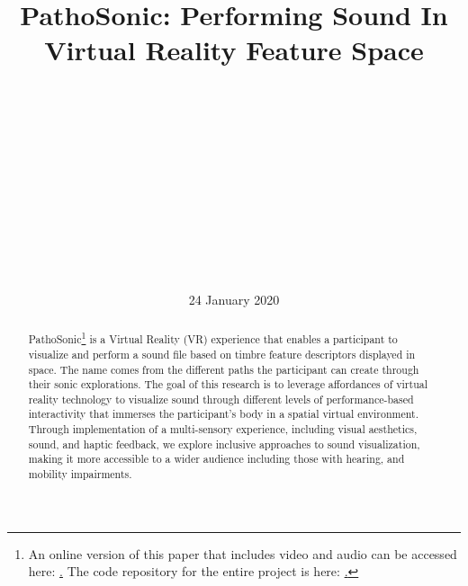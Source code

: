 \documentclass{nime-alternate}
\begin{document}
\title{PathoSonic: Performing Sound In Virtual Reality Feature Space}

\author{
\alignauthor

\\
       \\
       \\
       \\
       \\

\alignauthor
{}\\
       \\
       \\
       \\
       \\

}

\date{24 January 2020}
\maketitle

\begin{abstract}

PathoSonic\footnote{An online version of this paper that includes video and audio can be accessed here: \href{https://fdch.github.io/pathosonic}. The code repository for the entire project is here: \href{https://github.com/fdch/pathosonic}.} is a Virtual Reality (VR) experience that enables a participant to visualize and perform a sound file based on timbre feature descriptors displayed in space. The name comes from the different paths the participant can create through their sonic explorations. The goal of this research is to leverage affordances of virtual reality technology to visualize sound through different levels of performance-based interactivity that immerses the participant's body in a spatial virtual environment. Through implementation of a multi-sensory experience, including visual aesthetics, sound, and haptic feedback, we explore inclusive approaches to sound visualization, making it more accessible to a wider audience including those with hearing, and mobility impairments. 

\end{abstract}
\end{document}
